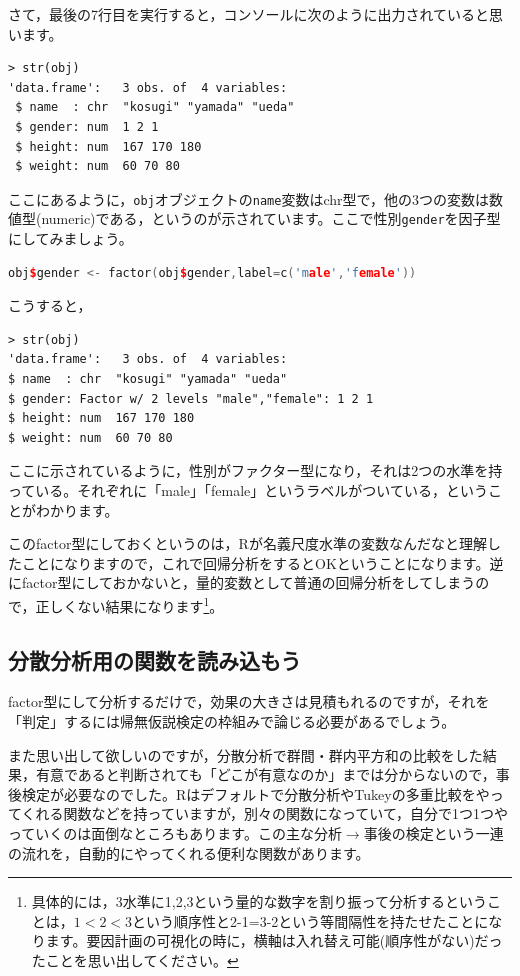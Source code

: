 \documentclass{ltjsarticle}
\begin{document}
さて，最後の7行目を実行すると，コンソールに次のように出力されていると思います。
\begin{tcolorbox}
\begin{verbatim}
> str(obj)
'data.frame':	3 obs. of  4 variables:
 $ name  : chr  "kosugi" "yamada" "ueda"
 $ gender: num  1 2 1
 $ height: num  167 170 180
 $ weight: num  60 70 80\end{verbatim}
\end{tcolorbox}
ここにあるように，\texttt{obj}オブジェクトの\texttt{name}変数はchr型で，他の3つの変数は数値型(numeric)である，というのが示されています。ここで性別\texttt{gender}を因子型にしてみましょう。
\begin{lstlisting}[language=c++]
obj$gender <- factor(obj$gender,label=c('male','female'))
\end{lstlisting}
こうすると，
\begin{tcolorbox}
\begin{verbatim}
> str(obj)
'data.frame':	3 obs. of  4 variables:
$ name  : chr  "kosugi" "yamada" "ueda"
$ gender: Factor w/ 2 levels "male","female": 1 2 1
$ height: num  167 170 180
$ weight: num  60 70 80\end{verbatim}
\end{tcolorbox}
ここに示されているように，性別がファクター型になり，それは2つの水準を持っている。それぞれに「male」「female」というラベルがついている，ということがわかります。

このfactor型にしておくというのは，Rが名義尺度水準の変数なんだなと理解したことになりますので，これで回帰分析をするとOKということになります。逆にfactor型にしておかないと，量的変数として普通の回帰分析をしてしまうので，正しくない結果になります\footnote{具体的には，3水準に1,2,3という量的な数字を割り振って分析するということは，$1<2<3$という順序性と2-1=3-2という等間隔性を持たせたことになります。要因計画の可視化の時に，横軸は入れ替え可能(順序性がない)だったことを思い出してください。}。

\subsection{分散分析用の関数を読み込もう}
factor型にして分析するだけで，効果の大きさは見積もれるのですが，それを「判定」するには帰無仮説検定の枠組みで論じる必要があるでしょう。

また思い出して欲しいのですが，分散分析で群間・群内平方和の比較をした結果，有意であると判断されても「どこが有意なのか」までは分からないので，事後検定が必要なのでした。Rはデフォルトで分散分析やTukeyの多重比較をやってくれる関数などを持っていますが，別々の関数になっていて，自分で1つ1つやっていくのは面倒なところもあります。この主な分析$\to$事後の検定という一連の流れを，自動的にやってくれる便利な関数があります。
\end{document}
